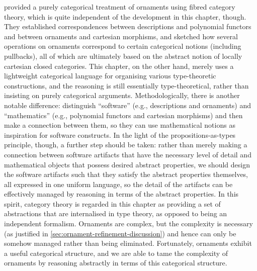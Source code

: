 \citet{Dagand-categorical-ornaments} provided a purely categorical treatment of ornaments using fibred category theory, which is quite independent of the development in this chapter, though.
They established correspondences between descriptions and polynomial functors~\citep{Gambino-polynomial-functors} and between ornaments and cartesian morphisms, and sketched how several operations on ornaments correspond to certain categorical notions (including pullbacks), all of which are ultimately based on the abstract notion of locally cartesian closed categories.
This chapter, on the other hand, merely uses a lightweight categorical language for organising various type-theoretic constructions, and the reasoning is still essentially type-theoretical, rather than insisting on purely categorical arguments.
Methodologically, there is another notable difference: \citeauthor{Dagand-categorical-ornaments} distinguish ``software'' (e.g., descriptions and ornaments) and ``mathematics'' (e.g., polynomial functors and cartesian morphisms) and then make a connection between them, so they can use mathematical notions as inspiration for software constructs.
In the light of the propositions-as-types principle, though, a further step should be taken: rather than merely making a connection between software artifacts that have the necessary level of detail and mathematical objects that possess desired abstract properties, we should design the software artifacts such that they satisfy the abstract properties themselves, all expressed in one uniform language, so the detail of the artifacts can be effectively managed by reasoning in terms of the abstract properties.
In this spirit, category theory is regarded in this chapter as providing a set of abstractions that are internalised in type theory, as opposed to being an independent formalism.
Ornaments are complex, but the complexity is necessary (as justified in \autoref{sec:ornament-refinement-discussion}) and hence can only be somehow managed rather than being eliminated.
Fortunately, ornaments exhibit a useful categorical structure, and we are able to tame the complexity of ornaments by reasoning abstractly in terms of this categorical structure.

